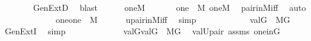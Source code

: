 \begin{isabellebody}
\ \ \ \ \ \ \isamarkupfalse%
\ GenExtD\ \isamarkupfalse%
\ blast\isanewline
\ \ \ \ \isamarkupfalse%
\ {\isacartoucheopen}one{\isasymin}M{\isacartoucheclose}\ \isanewline
\ \ \ \ \isamarkupfalse%
\ {\isachardoublequoteopen}{\isasymlangle}{\isasymtau}{\isacharcomma}{\kern0pt}one{\isasymrangle}\ {\isasymin}\ M{\isachardoublequoteclose}\ {\isachardoublequoteopen}{\isasymlangle}{\isasymrho}{\isacharcomma}{\kern0pt}one{\isasymrangle}{\isasymin}M{\isachardoublequoteclose}\ \isamarkupfalse%
\ pair{\isacharunderscore}{\kern0pt}in{\isacharunderscore}{\kern0pt}M{\isacharunderscore}{\kern0pt}iff\ \isamarkupfalse%
\ auto\isanewline
\ \ \ \ \isamarkupfalse%
\ \isanewline
\ \ \ \ \isamarkupfalse%
\ {}{\isacharcolon}{\kern0pt}\ {\isachardoublequoteopen}{\isacharbraceleft}{\kern0pt}{\isasymlangle}{\isasymtau}{\isacharcomma}{\kern0pt}one{\isasymrangle}{\isacharcomma}{\kern0pt}{\isasymlangle}{\isasymrho}{\isacharcomma}{\kern0pt}one{\isasymrangle}{\isacharbraceright}{\kern0pt}\ {\isasymin}\ M{\isachardoublequoteclose}\ {\isacharparenleft}{\kern0pt}\ {\isachardoublequoteopen}{\isacharquery}{\kern0pt}{\isasymsigma}\ {\isasymin}\ {\isacharunderscore}{\kern0pt}{\isachardoublequoteclose}{\isacharparenright}{\kern0pt}\ \isamarkupfalse%
\ upair{\isacharunderscore}{\kern0pt}in{\isacharunderscore}{\kern0pt}M{\isacharunderscore}{\kern0pt}iff\ \isamarkupfalse%
\ simp\isanewline
\ \ \ \ \isamarkupfalse%
\ \isanewline
\ \ \ \ \isamarkupfalse%
\ {\isachardoublequoteopen}val{\isacharparenleft}{\kern0pt}G{\isacharcomma}{\kern0pt}{\isacharquery}{\kern0pt}{\isasymsigma}{\isacharparenright}{\kern0pt}\ {\isasymin}\ M{\isacharbrackleft}{\kern0pt}G{\isacharbrackright}{\kern0pt}{\isachardoublequoteclose}\ \isamarkupfalse%
\ GenExtI\ \isamarkupfalse%
\ simp\isanewline
\ \ \ \ \isamarkupfalse%
\ {}\ \isanewline
\ \ \ \ \isamarkupfalse%
\ {\isachardoublequoteopen}{\isacharbraceleft}{\kern0pt}val{\isacharparenleft}{\kern0pt}G{\isacharcomma}{\kern0pt}{\isasymtau}{\isacharparenright}{\kern0pt}{\isacharcomma}{\kern0pt}val{\isacharparenleft}{\kern0pt}G{\isacharcomma}{\kern0pt}{\isasymrho}{\isacharparenright}{\kern0pt}{\isacharbraceright}{\kern0pt}\ {\isasymin}\ M{\isacharbrackleft}{\kern0pt}G{\isacharbrackright}{\kern0pt}{\isachardoublequoteclose}\ \isamarkupfalse%
\ val{\isacharunderscore}{\kern0pt}Upair\ assms\ one{\isacharunderscore}{\kern0pt}in{\isacharunderscore}{\kern0pt}G\ \isamarkupfalse%

\end{isabellebody}
